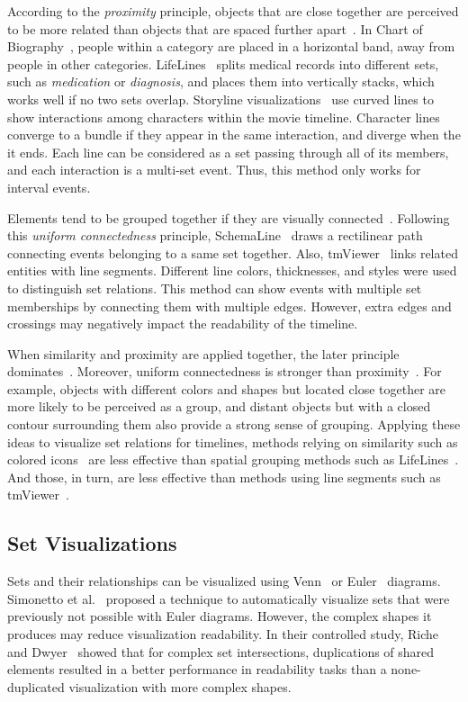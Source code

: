 According to the \textit{proximity} principle, objects that are close together are perceived to be more related than objects that are spaced further apart~\cite{Koffka1935}. In Chart of Biography~\cite{Priestley1765}, people within a category are placed in a horizontal band, away from people in other categories. LifeLines~\cite{Plaisant1998} splits medical records into different sets, such as \textit{medication} or \textit{diagnosis}, and places them into vertically stacks, which works well if no two sets overlap. Storyline visualizations~\cite{Tanahashi2012,Liu2013} use curved lines to show interactions among characters within the movie timeline. Character lines converge to a bundle if they appear in the same interaction, and diverge when the it ends. Each line can be considered as a set passing through all of its members, and each interaction is a multi-set event. Thus, this method only works for interval events.

Elements tend to be grouped together if they are visually connected~\cite{Palmer1994}. Following this \textit{uniform connectedness} principle, SchemaLine~\cite{Nguyen2014} draws a rectilinear path connecting events belonging to a same set together. Also, tmViewer~\cite{Kumar1998} links related entities with line segments. Different line colors, thicknesses, and styles were used to distinguish set relations. This method can show events with multiple set memberships by connecting them with multiple edges. However, extra edges and crossings may negatively impact the readability of the timeline.

When similarity and proximity are applied together, the later principle dominates~\cite{Ware2013}. Moreover, uniform connectedness is stronger than proximity~\cite{Palmer1994}. For example, objects with different colors and shapes but located close together are more likely to be perceived as a group, and distant objects but with a closed contour surrounding them also provide a strong sense of grouping. Applying these ideas to visualize set relations for timelines, methods relying on similarity such as colored icons~\cite{Wang2008} are less effective than spatial grouping methods such as LifeLines~\cite{Plaisant1996a}. And those, in turn, are less effective than methods using line segments such as tmViewer~\cite{Kumar1998}. 

\subsection{Set Visualizations}
Sets and their relationships can be visualized using Venn~\cite{Ruskey1997} or Euler~\cite{Rodgers2014} diagrams. Simonetto et al.~\cite{Simonetto2009} proposed a technique to automatically visualize sets that were previously not possible with Euler diagrams. However, the complex shapes it produces may reduce visualization readability. In their controlled study, Riche and Dwyer~\cite{Riche2010} showed that for complex set intersections, duplications of shared elements resulted in a better performance in readability tasks than a none-duplicated visualization with more complex shapes. 


